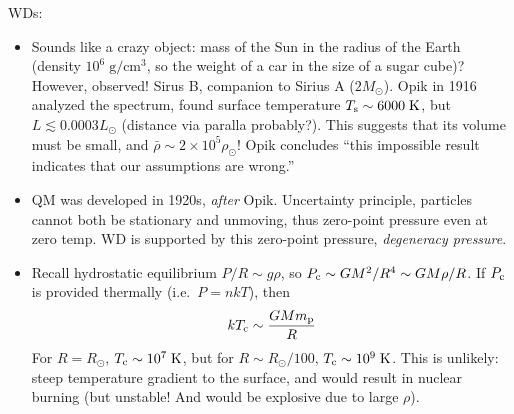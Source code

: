 \documentclass[11pt,
        usenames, %
        dvipsnames %
    ]{article}
\newcommand*{\scinot}[2]{#1\times10^{#2}}
\begin{document}
WDs:
\begin{itemize}
    \item Sounds like a crazy object: mass of the Sun in the radius of the
        Earth (density $10^6 \;\mathrm{g/cm^3}$, so the weight of a car in the
        size of a sugar cube)? However, observed! Sirus B, companion to Sirius A
        ($2M_{\odot}$). Opik in 1916 analyzed the spectrum, found surface
        temperature $T_{\rm s} \sim 6000\;\mathrm{K}$, but $L \lesssim 0.0003
        L_{\odot}$ (distance via paralla probably?). This suggests that its
        volume must be small, and $\bar{\rho} \sim \scinot{2}{5}\rho_{\odot}$!
        Opik concludes ``this impossible result indicates that our assumptions
        are wrong.''

    \item QM was developed in 1920s, \emph{after} Opik. Uncertainty principle,
        particles cannot both be stationary and unmoving, thus zero-point
        pressure even at zero temp. WD is supported by this zero-point pressure,
        \emph{degeneracy pressure}.

    \item Recall hydrostatic equilibrium $P/R \sim g\rho$, so $P_{\rm c} \sim
        GM^2 / R^4 \sim GM \rho / R$. If $P_{\rm c}$ is provided thermally
        (i.e.\ $P = nkT$), then
        \begin{equation}
            kT_{\rm c} \sim \frac{GMm_{\rm p}}{R}
        \end{equation}
        For $R = R_{\odot}$, $T_{\rm c} \sim 10^7\;\mathrm{K}$, but for $R \sim
        R_{\odot} / 100$, $T_{\rm c} \sim 10^9\;\mathrm{K}$. This is unlikely:
        steep temperature gradient to the surface, and would result in nuclear
        burning (but unstable! And would be explosive due to large $\rho$).


\end{itemize}
\end{document}
